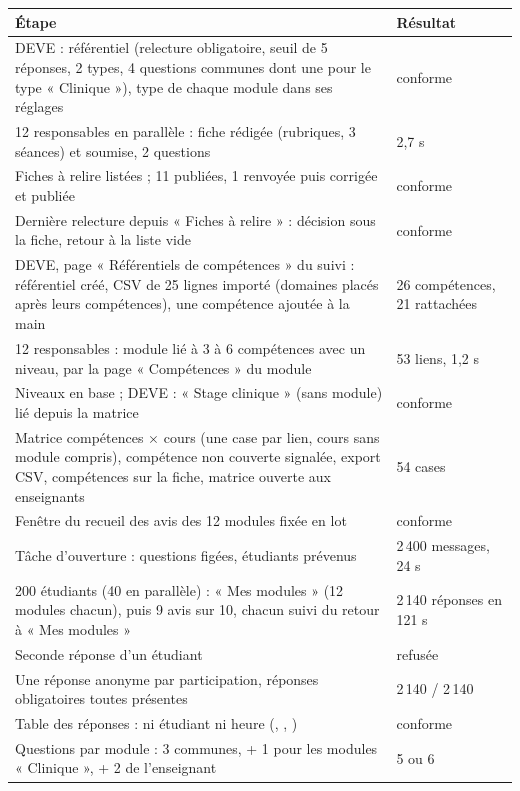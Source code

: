\documentclass[11pt,a4paper]{article}
\newcommand{\code}[1]{\texttt{\detokenize{#1}}}
\begin{document}
\begin{center}
\begin{tabularx}{\linewidth}{@{}X l@{}}
\toprule
\textbf{Étape} & \textbf{Résultat} \\
\midrule
DEVE : référentiel (relecture obligatoire, seuil de 5 réponses, 2 types, 4 questions
communes dont une pour le type « Clinique »), type de chaque module dans ses réglages & conforme \\
12 responsables en parallèle : fiche rédigée (rubriques, 3 séances) et soumise, 2 questions & 2,7 s \\
Fiches à relire listées ; 11 publiées, 1 renvoyée puis corrigée et publiée & conforme \\
Dernière relecture depuis « Fiches à relire » : décision sous la fiche, retour à la liste vide &
conforme \\
DEVE, page « Référentiels de compétences » du suivi : référentiel créé, CSV de 25 lignes
importé (domaines placés après leurs compétences), une compétence ajoutée à la main & 26
compétences, 21 rattachées \\
12 responsables : module lié à 3 à 6 compétences avec un niveau, par la page « Compétences » du
module & 53 liens, 1,2 s \\
Niveaux en base ; DEVE : « Stage clinique » (sans module) lié depuis la matrice & conforme \\
Matrice compétences $\times$ cours (une case par lien, cours sans module compris), compétence
non couverte signalée, export CSV, compétences sur la fiche, matrice ouverte aux enseignants &
54 cases \\
Fenêtre du recueil des avis des 12 modules fixée en lot & conforme \\
Tâche d'ouverture : questions figées, étudiants prévenus & 2\,400 messages, 24 s \\
200 étudiants (40 en parallèle) : « Mes modules » (12 modules chacun), puis 9 avis sur 10,
chacun suivi du retour à « Mes modules » & 2\,140 réponses en 121 s \\
Seconde réponse d'un étudiant & refusée \\
Une réponse anonyme par participation, réponses obligatoires toutes présentes & 2\,140 / 2\,140 \\
Table des réponses : ni étudiant ni heure (\code{id}, \code{syllabusid}, \code{daysubmitted}) &
conforme \\
Questions par module : 3 communes, + 1 pour les modules « Clinique », + 2 de l'enseignant &
5 ou 6 \\

\end{tabularx}
\end{center}
\end{document}
